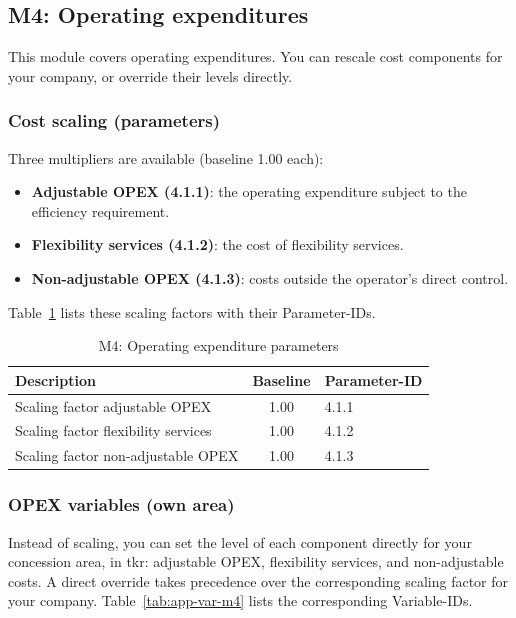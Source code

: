 \subsection{M4: Operating expenditures}
\label{sec:spec-m4}

This module covers operating expenditures. You can rescale cost components for your company, or override their levels directly.

\subsubsection{Cost scaling (parameters)}
Three multipliers are available (baseline 1.00 each):

\begin{itemize}
  \item \textbf{Adjustable OPEX (4.1.1)}: the operating expenditure subject to the efficiency requirement.
  \item \textbf{Flexibility services (4.1.2)}: the cost of flexibility services.
  \item \textbf{Non-adjustable OPEX (4.1.3)}: costs outside the operator's direct control.
\end{itemize}

\noindent Table~\ref{tab:app-m4} lists these scaling factors with their Parameter-IDs.

\begin{table}[H]
\centering
\begin{singlespace}
\footnotesize
\begin{threeparttable}
\caption{M4: Operating expenditure parameters}
\label{tab:app-m4}
\begin{tabular}{@{}lcl@{}}
\toprule
\textbf{Description} & \textbf{Baseline} & \textbf{Parameter-ID} \\
\midrule
Scaling factor adjustable OPEX & 1.00 & 4.1.1 \\
Scaling factor flexibility services & 1.00 & 4.1.2 \\
Scaling factor non-adjustable OPEX & 1.00 & 4.1.3 \\
\bottomrule
\end{tabular}
\end{threeparttable}
\end{singlespace}
\end{table}

\subsubsection{OPEX variables (own area)}
Instead of scaling, you can set the level of each component directly for your concession area, in tkr: adjustable OPEX, flexibility services, and non-adjustable costs. A direct override takes precedence over the corresponding scaling factor for your company. Table~\ref{tab:app-var-m4} lists the corresponding Variable-IDs.

